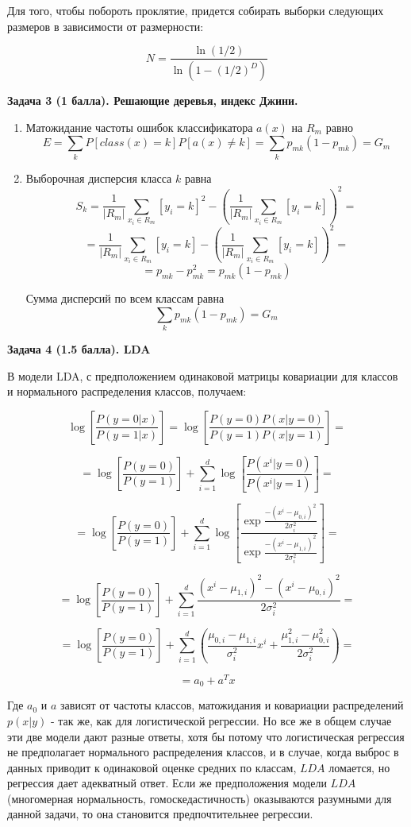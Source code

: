 \documentclass[a4paper]{article}
\begin{document}
Для того, чтобы побороть проклятие, придется собирать выборки следующих размеров в зависимости от размерности:

$$ N = \frac{\ln(1/2)}{\ln(1-(1/2)^D)} $$

\bigskip

\textbf{Задача 3 (1 балла). Решающие деревья, индекс Джини.}



\begin{enumerate}
	\item {} Матожидание частоты ошибок классификатора $a(x)$ на $R_m$ равно
	$$ E  = \sum_{k} P[class(x) = k]  P[a(x) \neq k] = \sum_k p_{mk} (1-p_{mk}) = G_m$$
	\item {} Выборочная дисперсия класса $k$ равна
	$$S_k = \frac{1}{|R_m|}\sum_{ x_i \in R_m }[y_i = k]^2 -\left(\frac{1}{|R_m|}\sum_{ x_i \in R_m }[y_i = k]\right)^2 = $$
	$$= \frac{1}{|R_m|}\sum_{ x_i \in R_m }[y_i = k] -\left(\frac{1}{|R_m|}\sum_{ x_i \in R_m }[y_i = k]\right)^2 =$$
	$$ = p_{mk} - p_{mk}^2 = p_{mk}(1-p_{mk}) $$
	
	Сумма дисперсий по всем классам равна
	$$ \sum_k p_{mk}(1-p_{mk})  = G_m$$
\end{enumerate}



\bigskip
\textbf{Задача 4 (1.5 балла). LDA}

В модели LDA, с предположением одинаковой матрицы ковариации для классов и нормального распределения классов, получаем:

$$ \log\left[{\frac{P(y = 0 | x)}{P(y = 1 | x)}}\right] = \log\left[{\frac{P(y = 0) P(x| y=0)}{P(y = 1)P(x| y=1)}}\right] =$$

$$= \log\left[{\frac{P(y = 0)}{P(y = 1)}}\right] + \sum_{i=1}^{d}\log \left[ \frac{P(x^i | y = 0)}{P(x^i |y = 1)} \right] =$$

$$= \log\left[{\frac{P(y = 0)}{P(y = 1)}}\right] + \sum_{i=1}^{d}\log \left[ \frac{\exp {\frac{-(x^i -\mu_{0,i} )^2}{2\sigma_i^2}} }{ \exp {\frac{-(x^i -\mu_{1,i} )^2}{2\sigma_i^2}}  } \right] =$$

$$= \log\left[{\frac{P(y = 0)}{P(y = 1)}}\right] + \sum_{i=1}^{d} \frac{(x^i -\mu_{1,i} )^2-(x^i -\mu_{0,i} )^2}{2\sigma_i^2}=$$

$$= \log\left[{\frac{P(y = 0)}{P(y = 1)}}\right] + \sum_{i=1}^{d}\left( \frac{\mu_{0,i}-\mu_{1,i} }{\sigma_i^2}x^i + \frac{\mu_{1,i}^2-\mu_{0,i}^2 }{2\sigma_i^2}\right)=$$

$$ =a_0 + a^Tx $$

Где $a_0$ и $a$ зависят от  частоты классов, матожидания и ковариации распределений $p(x|y)$ - так же, как для логистической регрессии. Но все же в общем случае эти две модели дают разные ответы, хотя бы потому что логистическая регрессия не предполагает нормального распределения классов, и в случае, когда выброс в данных приводит к одинаковой оценке средних по классам, $LDA$ ломается, но регрессия дает адекватный ответ. Если же предположения модели $LDA$ (многомерная нормальность, гомоскедастичность) оказываются разумными для данной задачи, то она становится предпочтительнее регрессии.
\end{document}
